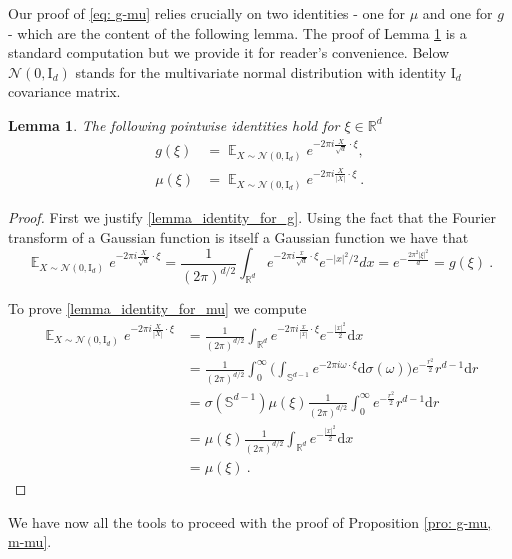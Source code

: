 \documentclass[a4paper, reqno]{amsart}
\newtheorem{lemma}[thm]{Lemma}
\theoremstyle{definition}
\newcommand{\R}{{\mathbb R}}
\newcommand{\dd}{{\mathrm d}}
\begin{document}
Our proof of \eqref{eq: g-mu} relies crucially on two identities - one for $\mu$ and one for $g$ - which are the content of the following lemma. The proof of Lemma \ref{lem: identity_for_mu,g}  is a standard computation but we provide it for reader's convenience. Below $\mathcal{N}(0,\textrm{I}_d)$ stands for the multivariate normal distribution with identity $\textrm{I}_d$ covariance matrix.
\begin{lemma}\label{lem: identity_for_mu,g} The following pointwise identities hold for $\xi \in \R^d$
\begin{align}
\label{lemma_identity_for_g}
g(\xi)&=\mathop{\mathbb{E}}_{X\sim \mathcal{N}(0,\textrm{I}_d)} e^{- 2\pi i \tfrac{X}{\sqrt{d}}\cdot \xi},\\
\label{lemma_identity_for_mu}
   \mu(\xi) &= \mathop{\mathbb{E}}_{X\sim \mathcal{N}(0,\textrm{I}_d)} e^{-2\pi i \tfrac{X}{|X|}\cdot \xi}~.
\end{align}
\end{lemma}
\begin{proof} 
First we justify \eqref{lemma_identity_for_g}. Using the fact that the Fourier transform of a Gaussian function is itself a Gaussian function we have that
$$\mathop{\mathbb{E}}_{X\sim \mathcal{N}(0,\textrm{I}_d)} e^{- 2\pi i \tfrac{X}{\sqrt{d}}\cdot \xi}= \frac{1}{(2\pi)^{d/2}} \int_{\mathbb{R}^d} e^{-2\pi i \tfrac{x}{\sqrt{d}}\cdot\xi}e^{-|x|^2/2}dx = e^{-\tfrac{2\pi^2|\xi|^2}{d}}= g(\xi)~.$$

To prove \eqref{lemma_identity_for_mu} we compute
\begin{align*} \mathop{\mathbb{E}}_{X\sim \mathcal{N}(0,\textrm{I}_d)} e^{-2\pi i \tfrac{X}{|X|}\cdot \xi} & = \frac{1}{(2\pi)^{d/2}}\int_{\mathbb{R}^d}  e^{-2\pi i \tfrac{x}{|x|}\cdot \xi} e^{-\tfrac{|x|^2}{2}}\dd x \\
& = \frac{1}{(2\pi)^{d/2}}\int_0^\infty \bigg( \int_{\mathbb{S}^{d-1}}  e^{-2\pi i\omega \cdot \xi} \dd\sigma(\omega)\bigg) e^{-\tfrac{r^2}{2}} r^{d-1}\dd r  \\
&= \sigma(\mathbb{S}^{d-1}) \mu(\xi) \frac{1}{(2\pi)^{d/2}}\int_0^\infty e^{-\tfrac{r^2}{2}} r^{d-1}\dd r \\
&= \mu(\xi) \frac{1}{(2\pi)^{d/2}}\int_{\mathbb{R}^d} e^{-\tfrac{|x|^2}{2}}\dd x \\
&= \mu(\xi)~.
\end{align*}
\end{proof}




We have now all the tools to proceed with the proof of Proposition \ref{pro: g-mu, m-mu}.
\end{document}
